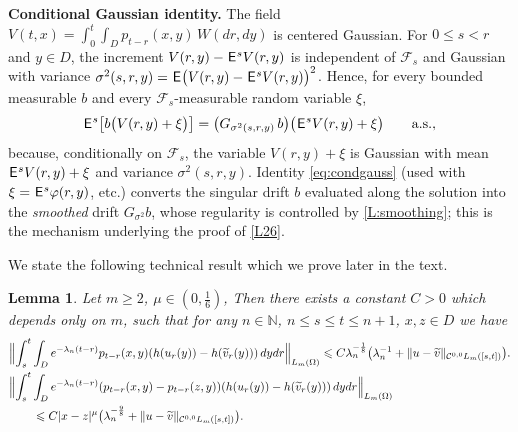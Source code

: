 \documentclass[12pt]{article}
\newtheorem{lemma}[theorem]{Lemma}
\theoremstyle{definition}
\DeclareMathOperator{\1}{\mathbbm{1}}%
\def\E{\hskip.15ex\mathsf{E}\hskip.10ex}
\def\phi{\varphi}
\renewcommand{\ge}{\geqslant}
\renewcommand{\le}{\leqslant}
\newcommand{\nn}{\nonumber}
\newcommand{\wt}{\widetilde}
\newcommand{\C}{\mathcal{C}}
\newcommand{\F}{\mathcal{F}}
\newcommand{\N}{\mathbb{N}}
\begin{document}
\noindent\textbf{Conditional Gaussian identity.}
The field $V(t,x)=\int_0^t\int_D p_{t-r}(x,y)\,W(dr,dy)$ is centered Gaussian. For
$0\le s<r$ and $y\in D$, the increment $V(r,y)-\E^sV(r,y)$ is independent of $\F_s$ and Gaussian
with variance $\sigma^2(s,r,y)=\E\bigl(V(r,y)-\E^sV(r,y)\bigr)^2$. Hence, for every
bounded measurable $b$ and every $\F_s$-measurable random variable $\xi$,
\begin{equation}\label{eq:condgauss}
\E^s\bigl[b\bigl(V(r,y)+\xi\bigr)\bigr]
=\bigl(G_{\sigma^2(s,r,y)}\,b\bigr)\bigl(\E^sV(r,y)+\xi\bigr)\qquad\text{a.s.},
\end{equation}
because, conditionally on $\F_s$, the variable $V(r,y)+\xi$ is Gaussian with mean
$\E^sV(r,y)+\xi$ and variance $\sigma^2(s,r,y)$. Identity \eqref{eq:condgauss} (used with
$\xi=\E^s\phi(r,y)$, etc.) converts the singular drift $b$ evaluated along the solution
into the \emph{smoothed} drift $G_{\sigma^2}b$, whose regularity is controlled by
\cref{L:smoothing}; this is the mechanism underlying the proof of \cref{L26}.


We state the following technical result which we prove later in the text.
\begin{lemma}\label{L:main}
Let $m\ge2$,  $\mu\in(0,\frac16)$, Then there exists a constant $C>0$ which depends only on $m$, such that for any $n\in\N$, $n\le s \le t\le n+1$, $x,z\in D$  we have 
\begin{align}\label{sdeb2}
&\Bigl\|\int_s^t \int_D e^{-\lambda_n(t-r)}p_{t-r}(x,y)(h(u_r(y))-h(\wt v_r(y)))\,dy dr\Bigr\|_{L_m(\Omega)}\le  C\lambda_n^{-\frac18}\bigl(\lambda_n^{-1}+ \|u-\wt v\|_{\C^{0,0}L_m([s,t])}\bigr). \\
  	&\Bigl\|\int_s^t \int_D e^{-\lambda_n(t-r)}(p_{t-r}(x,y)-p_{t-r}(z,y))(h(u_r(y))-h(\wt v_r(y)))\,dy dr\Bigr\|_{L_m(\Omega)}\nn\\
	&\qquad\le 
	C |x-z|^{\mu} \bigl(\lambda_n^{-\frac98}+\|u-\wt v\|_{\C^{0,0}L_m([s,t])}\bigr). \label{sdeb3}
\end{align}
\end{lemma}
\end{document}
